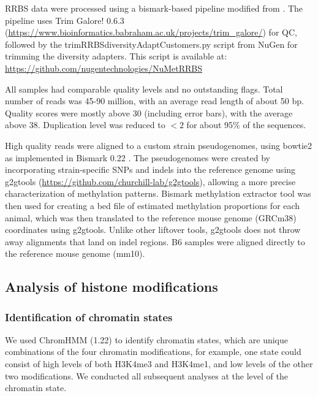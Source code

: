 \documentclass[
  11pt,
]{article}
\begin{document}
RRBS data were processed using a bismark-based pipeline modified from
\citep{pmid30348905}. The pipeline uses Trim Galore! 0.6.3
(\url{https://www.bioinformatics.babraham.ac.uk/projects/trim_galore/})
for QC, followed by the trimRRBSdiversityAdaptCustomers.py script from
NuGen for trimming the diversity adapters. This script is available at:
\url{https://github.com/nugentechnologies/NuMetRRBS}

All samples had comparable quality levels and no outstanding flags.
Total number of reads was 45-90 million, with an average read length of
about 50 bp. Quality scores were mostly above 30 (including error bars),
with the average above 38. Duplication level was reduced to \(<2\) for
about 95\% of the sequences.

High quality reads were aligned to a custom strain pseudogenomes, using
bowtie2 as implemented in Bismark 0.22 \citep{pmid21493656}. The
pseudogenomes were created by incorporating strain-specific SNPs and
indels into the reference genome using g2gtools
(\url{https://github.com/churchill-lab/g2gtools}), allowing a more
precise characterization of methylation patterns. Bismark methylation
extractor tool was then used for creating a bed file of estimated
methylation proportions for each animal, which was then translated to
the reference mouse genome (GRCm38) coordinates using g2gtools. Unlike
other liftover tools, g2gtools does not throw away alignments that land
on indel regions. B6 samples were aligned directly to the reference
mouse genome (mm10).

\hypertarget{analysis-of-histone-modifications}{%
\subsection{Analysis of histone
modifications}\label{analysis-of-histone-modifications}}

\hypertarget{identification-of-chromatin-states}{%
\subsubsection{Identification of chromatin
states}\label{identification-of-chromatin-states}}

We used ChromHMM (1.22) \citep{pmid29120462} to identify chromatin
states, which are unique combinations of the four chromatin
modifications, for example, one state could consist of high levels of
both H3K4me3 and H3K4me1, and low levels of the other two modifications.
We conducted all subsequent analyses at the level of the chromatin
state.
\end{document}
